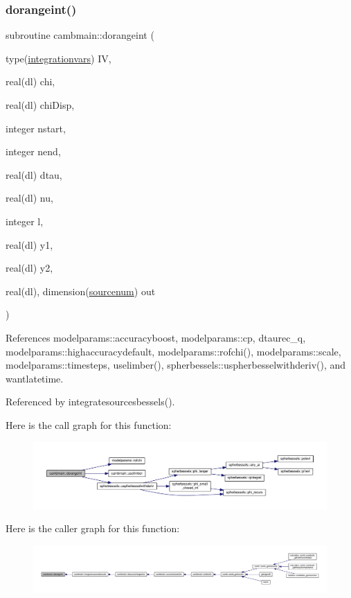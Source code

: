 \subsubsection{\texorpdfstring{dorangeint()}{dorangeint()}}
{\footnotesize\ttfamily subroutine cambmain\+::dorangeint (\begin{DoxyParamCaption}\item[{type(\mbox{\hyperlink{structcambmain_1_1integrationvars}{integrationvars}})}]{IV,  }\item[{real(dl)}]{chi,  }\item[{real(dl)}]{chi\+Disp,  }\item[{integer}]{nstart,  }\item[{integer}]{nend,  }\item[{real(dl)}]{dtau,  }\item[{real(dl)}]{nu,  }\item[{integer}]{l,  }\item[{real(dl)}]{y1,  }\item[{real(dl)}]{y2,  }\item[{real(dl), dimension(\mbox{\hyperlink{namespacecambmain_a7874020426cc2db0dd79451dce8e4476}{sourcenum}})}]{out }\end{DoxyParamCaption})}



References modelparams\+::accuracyboost, modelparams\+::cp, dtaurec\+\_\+q, modelparams\+::highaccuracydefault, modelparams\+::rofchi(), modelparams\+::scale, modelparams\+::timesteps, uselimber(), spherbessels\+::uspherbesselwithderiv(), and wantlatetime.



Referenced by integratesourcesbessels().

Here is the call graph for this function\+:
\nopagebreak
\begin{figure}[H]
\begin{center}
\leavevmode
\includegraphics[width=350pt]{namespacecambmain_af0980e25384f7d9b2eb64435231f3aa5_cgraph}
\end{center}
\end{figure}
Here is the caller graph for this function\+:
\nopagebreak
\begin{figure}[H]
\begin{center}
\leavevmode
\includegraphics[width=350pt]{namespacecambmain_af0980e25384f7d9b2eb64435231f3aa5_icgraph}
\end{center}
\end{figure}
\mbox{\label{namespacecambmain_af5113df414eaba3ff8913a737da72c34}} 
